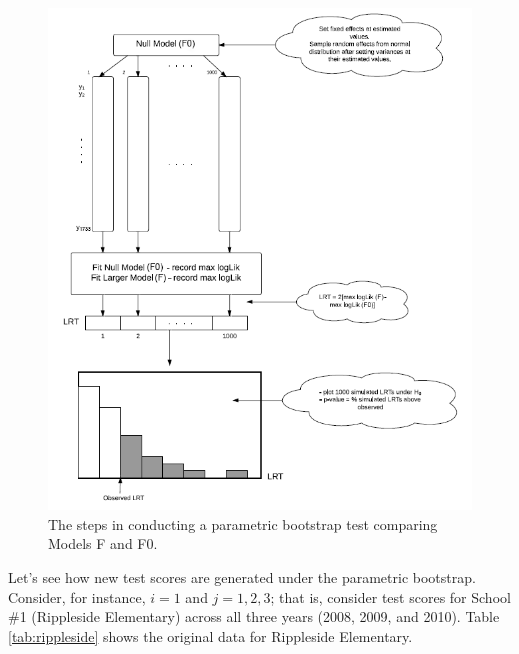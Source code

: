 \documentclass[
]{krantz}
\begin{document}
\begin{figure}
\includegraphics[width=0.8\linewidth]{data/ParametricBootstrapDiagram9} \caption{The steps in conducting a parametric bootstrap test comparing Models F and F0.}\label{fig:parabootdiagram}
\end{figure}

Let's see how new test scores are generated under the parametric bootstrap. Consider, for instance, \(i=1\) and \(j=1,2,3\); that is, consider test scores for School \#1 (Rippleside Elementary) across all three years (2008, 2009, and 2010). Table \ref{tab:rippleside} shows the original data for Rippleside Elementary.

\begin{table}

\caption{\label{tab:rippleside}Original data for Rippleside Elementary (School 1)}
\centering
{}
\end{table}
\end{document}
